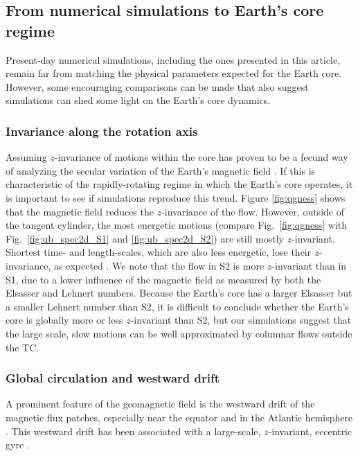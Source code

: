 \documentclass[12pt, a4paper]{article}
\begin{document}
 


\subsection{From numerical simulations to Earth's core regime}

Present-day numerical simulations, including the ones presented in this article, remain far from matching the physical parameters expected for the Earth core.
However, some encouraging comparisons can be made that also suggest simulations can shed some light on the Earth's core dynamics.

\subsubsection{Invariance along the rotation axis}
Assuming $z$-invariance of motions within the core has proven to be a fecund way of analyzing the secular variation of the Earth's magnetic field \citep[e.g.][]{gillet2010,gillet2011}.
If this is characteristic of the rapidly-rotating regime in which the Earth's core operates, it is important to see if simulations reproduce this trend.
Figure \ref{fig:qgness} shows that the magnetic field reduces the $z$-invariance of the flow.
However, outside of the tangent cylinder, the most energetic motions (compare Fig.~\ref{fig:qgness} with Fig.~\ref{fig:ub_spec2d_S1} and \ref{fig:ub_spec2d_S2}) are still mostly $z$-invariant.
Shortest time- and length-scales, which are also less energetic, lose their $z$-invariance, as expected \citep{nataf2015}.
We note that the flow in S2 is more $z$-invariant than in S1, due to a lower influence of the magnetic field as measured by both the Elsasser and Lehnert numbers.
Because the Earth's core has a larger Elsasser but a smaller Lehnert number than S2, it is difficult to conclude whether the Earth's core is globally more or less $z$-invariant than S2, but our simulations suggest that the large scale, slow motions can be well approximated by columnar flows outside the TC.

\subsubsection{Global circulation and westward drift}	\label{sec:gyre_drift}

A prominent feature of the geomagnetic field is the westward drift of the magnetic flux patches, especially near the equator and in the Atlantic hemisphere \citep[e.g.][]{finlay2003}.
This westward drift has been associated with a large-scale, $z$-invariant, eccentric gyre \citep[e.g.][]{pais2008,pais2015,gillet2015}.
\end{document}
